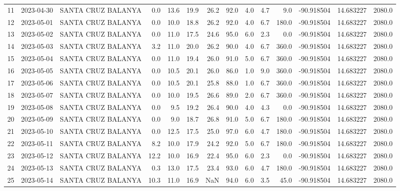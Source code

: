 \documentclass[12pt]{article}
\begin{document}
\begin{center}
\begin{tabular}{lllrrrrrrrrrrr}
11  & 2023-04-30 &  SANTA CRUZ BALANYA &     0.0 &  13.6 &   19.9 &  26.2 &     92.0 &  4.0 &         4.7 &         9.0 & -90.918504 &  14.683227 &   2080.0 \\
12  & 2023-05-01 &  SANTA CRUZ BALANYA &     0.0 &  10.0 &   18.8 &  26.2 &     92.0 &  4.0 &         6.7 &       180.0 & -90.918504 &  14.683227 &   2080.0 \\
13  & 2023-05-02 &  SANTA CRUZ BALANYA &     0.0 &  11.0 &   17.5 &  24.6 &     95.0 &  6.0 &         2.3 &         0.0 & -90.918504 &  14.683227 &   2080.0 \\
14  & 2023-05-03 &  SANTA CRUZ BALANYA &     3.2 &  11.0 &   20.0 &  26.2 &     90.0 &  4.0 &         6.7 &       360.0 & -90.918504 &  14.683227 &   2080.0 \\
15  & 2023-05-04 &  SANTA CRUZ BALANYA &     0.0 &  11.0 &   19.4 &  26.0 &     91.0 &  5.0 &         6.7 &       360.0 & -90.918504 &  14.683227 &   2080.0 \\
16  & 2023-05-05 &  SANTA CRUZ BALANYA &     0.0 &  10.5 &   20.1 &  26.0 &     86.0 &  1.0 &         9.0 &       360.0 & -90.918504 &  14.683227 &   2080.0 \\
17  & 2023-05-06 &  SANTA CRUZ BALANYA &     0.0 &  10.5 &   20.1 &  25.8 &     88.0 &  1.0 &         6.7 &       360.0 & -90.918504 &  14.683227 &   2080.0 \\
18  & 2023-05-07 &  SANTA CRUZ BALANYA &     0.0 &  10.0 &   19.5 &  26.6 &     89.0 &  2.0 &         6.7 &       360.0 & -90.918504 &  14.683227 &   2080.0 \\
19  & 2023-05-08 &  SANTA CRUZ BALANYA &     0.0 &   9.5 &   19.2 &  26.4 &     90.0 &  4.0 &         4.3 &         0.0 & -90.918504 &  14.683227 &   2080.0 \\
20  & 2023-05-09 &  SANTA CRUZ BALANYA &     0.0 &   9.0 &   18.7 &  26.8 &     91.0 &  5.0 &         6.7 &       180.0 & -90.918504 &  14.683227 &   2080.0 \\
21  & 2023-05-10 &  SANTA CRUZ BALANYA &     0.0 &  12.5 &   17.5 &  25.0 &     97.0 &  6.0 &         4.7 &       180.0 & -90.918504 &  14.683227 &   2080.0 \\
22  & 2023-05-11 &  SANTA CRUZ BALANYA &     8.2 &  10.0 &   17.9 &  24.2 &     92.0 &  5.0 &         6.7 &       180.0 & -90.918504 &  14.683227 &   2080.0 \\
23  & 2023-05-12 &  SANTA CRUZ BALANYA &    12.2 &  10.0 &   16.9 &  22.4 &     95.0 &  6.0 &         2.3 &         0.0 & -90.918504 &  14.683227 &   2080.0 \\
24  & 2023-05-13 &  SANTA CRUZ BALANYA &     0.3 &  13.0 &   17.5 &  23.4 &     93.0 &  6.0 &         4.7 &       180.0 & -90.918504 &  14.683227 &   2080.0 \\
25  & 2023-05-14 &  SANTA CRUZ BALANYA &    10.3 &  11.0 &   16.9 &   NaN &     94.0 &  6.0 &         3.5 &        45.0 & -90.918504 &  14.683227 &   2080.0 \\
\bottomrule
\end{tabular}

        
        \end{center}
        
\end{document}
